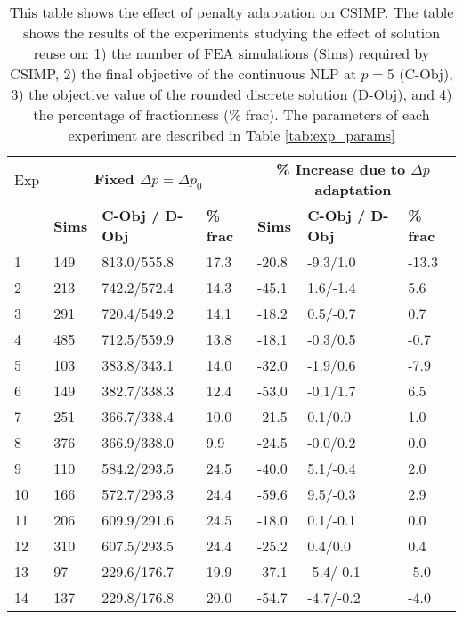 \begin{table}
\centering
\tabcolsep=0.09cm
\caption{This table shows the effect of penalty adaptation on CSIMP. The table shows the results of the experiments studying the effect of solution reuse on: 1) the number of FEA simulations (Sims) required by CSIMP, 2) the final objective of the continuous NLP at $p = 5$ (C-Obj), 3) the objective value of the rounded discrete solution (D-Obj), and 4) the percentage of fractionness (\% frac). The parameters of each experiment are described in Table \ref{tab:exp_params}}
\label{tab:csimp_reuse}
\begin{tabular}{|l|l|l|l|l||l|l|}
\hline\noalign{\smallskip}
Exp & \multicolumn{3}{c||}{\textbf{Fixed $\Delta p = \Delta p_0$}} & \multicolumn{3}{c|}{\textbf{\% Increase due to $\Delta p$ adaptation}}\\
\noalign{\smallskip}\hline\noalign{\smallskip}
& \textbf{Sims} & \textbf{C-Obj / D-Obj} & \textbf{\% frac} & \textbf{Sims} & \textbf{C-Obj / D-Obj} & \textbf{\% frac} \\
\hline
1 & 149 & 813.0/555.8 & 17.3 & -20.8 & -9.3/1.0 & -13.3 \\ 
\hline
2 &  213 & 742.2/572.4 & 14.3 & -45.1 & 1.6/-1.4 & 5.6 \\ 
\hline
3 &  291 & 720.4/549.2 & 14.1 & -18.2 & 0.5/-0.7 & 0.7 \\ 
\hline
4 &  485 & 712.5/559.9 & 13.8 & -18.1 & -0.3/0.5 & -0.7 \\ 
\hline
5 & 103 & 383.8/343.1 & 14.0 & -32.0 & -1.9/0.6 & -7.9 \\ 
\hline
6 & 149 & 382.7/338.3 & 12.4 & -53.0 & -0.1/1.7 & 6.5 \\ 
\hline
7 & 251 & 366.7/338.4 & 10.0 & -21.5 & 0.1/0.0 & 1.0 \\ 
\hline
8 & 376 & 366.9/338.0 & 9.9 & -24.5 & -0.0/0.2 & 0.0 \\ 
\hline
\hline
9 & 110 & 584.2/293.5 & 24.5 & -40.0 & 5.1/-0.4 & 2.0 \\ 
\hline
10 & 166 & 572.7/293.3 & 24.4 & -59.6 & 9.5/-0.3 & 2.9 \\ 
\hline
11 & 206 & 609.9/291.6 & 24.5 & -18.0 & 0.1/-0.1 & 0.0 \\ 
\hline
12 & 310 & 607.5/293.5 & 24.4 & -25.2 & 0.4/0.0 & 0.4 \\ 
\hline
13 & 97 & 229.6/176.7 & 19.9 & -37.1 & -5.4/-0.1 & -5.0 \\ 
\hline
14 & 137 & 229.8/176.8 & 20.0 & -54.7 & -4.7/-0.2 & -4.0 \\ 
\hline

\end{tabular}
\end{table}
